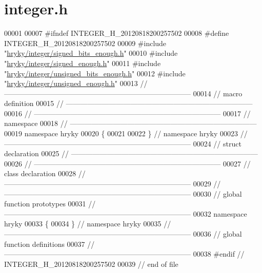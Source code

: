 \hypertarget{integer_8h_source}{\section{integer.\-h}
}

\begin{DoxyCode}
00001 
00007 \textcolor{preprocessor}{#ifndef INTEGER\_H\_20120818200257502}
00008 \textcolor{preprocessor}{}\textcolor{preprocessor}{#define INTEGER\_H\_20120818200257502}
00009 \textcolor{preprocessor}{}\textcolor{preprocessor}{#include "\hyperlink{signed__bits__enough_8h}{hryky/integer/signed_bits_enough.h}"}
00010 \textcolor{preprocessor}{#include "\hyperlink{signed__enough_8h}{hryky/integer/signed_enough.h}"}
00011 \textcolor{preprocessor}{#include "\hyperlink{unsigned__bits__enough_8h}{hryky/integer/unsigned_bits_enough.h}"}
00012 \textcolor{preprocessor}{#include "\hyperlink{unsigned__enough_8h}{hryky/integer/unsigned_enough.h}"}
00013 \textcolor{comment}{//
      ------------------------------------------------------------------------------}
00014 \textcolor{comment}{// macro definition}
00015 \textcolor{comment}{//
      ------------------------------------------------------------------------------}
00016 \textcolor{comment}{//
      ------------------------------------------------------------------------------}
00017 \textcolor{comment}{// namespace}
00018 \textcolor{comment}{//
      ------------------------------------------------------------------------------}
00019 \textcolor{keyword}{namespace }hryky
00020 \{
00021     
00022 \} \textcolor{comment}{// namespace hryky}
00023 \textcolor{comment}{//
      ------------------------------------------------------------------------------}
00024 \textcolor{comment}{// struct declaration}
00025 \textcolor{comment}{//
      ------------------------------------------------------------------------------}
00026 \textcolor{comment}{//
      ------------------------------------------------------------------------------}
00027 \textcolor{comment}{// class declaration}
00028 \textcolor{comment}{//
      ------------------------------------------------------------------------------}
00029 \textcolor{comment}{//
      ------------------------------------------------------------------------------}
00030 \textcolor{comment}{// global function prototypes}
00031 \textcolor{comment}{//
      ------------------------------------------------------------------------------}
00032 \textcolor{keyword}{namespace }hryky
00033 \{
00034 \} \textcolor{comment}{// namespace hryky}
00035 \textcolor{comment}{//
      ------------------------------------------------------------------------------}
00036 \textcolor{comment}{// global function definitions}
00037 \textcolor{comment}{//
      ------------------------------------------------------------------------------}
00038 \textcolor{preprocessor}{#endif // INTEGER\_H\_20120818200257502}
00039 \textcolor{preprocessor}{}\textcolor{comment}{// end of file}
\end{DoxyCode}
